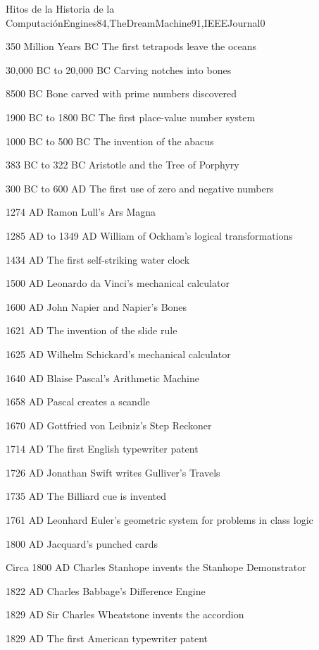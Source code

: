\begin{syllabus}
\begin{unit}{Hitos de la Historia de la Computación}{Engines84,TheDreamMachine91,IEEEJournal}{0}
\begin{topics}
      \item 350 Million Years BC The first tetrapods leave the oceans
	\item 30,000 BC to 20,000 BC Carving notches into bones
	\item 8500 BC Bone carved with prime numbers discovered
	\item 1900 BC to 1800 BC The first place-value number system
	\item 1000 BC to 500 BC The invention of the abacus
	\item 383 BC to 322 BC Aristotle and the Tree of Porphyry
	\item 300 BC to 600 AD The first use of zero and negative numbers
	\item 1274 AD Ramon Lull's Ars Magna
	\item 1285 AD to 1349 AD William of Ockham's logical transformations
	\item 1434 AD The first self-striking water clock
	\item 1500 AD Leonardo da Vinci's mechanical calculator
	\item 1600 AD John Napier and Napier's Bones
	\item 1621 AD The invention of the slide rule
	\item 1625 AD Wilhelm Schickard's mechanical calculator
	\item 1640 AD Blaise Pascal's Arithmetic Machine
	\item 1658 AD Pascal creates a scandle
	\item 1670 AD Gottfried von Leibniz's Step Reckoner
	\item 1714 AD The first English typewriter patent
	\item 1726 AD Jonathan Swift writes Gulliver's Travels
	\item 1735 AD The Billiard cue is invented
	\item 1761 AD Leonhard Euler's geometric system for problems in class logic
	\item 1800 AD Jacquard's punched cards
	\item Circa 1800 AD Charles Stanhope invents the Stanhope Demonstrator
	\item 1822 AD Charles Babbage's Difference Engine
	\item 1829 AD Sir Charles Wheatstone invents the accordion
	\item 1829 AD The first American typewriter patent

\end{topics}
\end{unit}
\end{syllabus}
